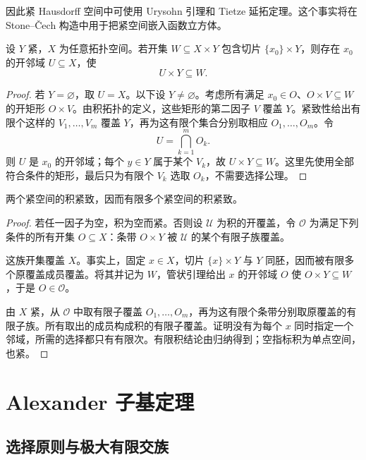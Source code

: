 因此紧 Hausdorff 空间中可使用 Urysohn 引理和 Tietze 延拓定理。这个事实将在 Stone--Čech 构造中用于把紧空间嵌入函数立方体。

\begin{lemma}[管状引理]
\label{lem:tube-lemma}
设 \(Y\) 紧，\(X\) 为任意拓扑空间。若开集
\(W\subseteq X\times Y\) 包含切片 \(\{x_0\}\times Y\)，则存在
\(x_0\) 的开邻域 \(U\subseteq X\)，使
\[
 U\times Y\subseteq W.
\]
\end{lemma}

\begin{proof}
若 \(Y=\varnothing\)，取 \(U=X\)。以下设 \(Y\ne\varnothing\)。考虑所有满足 \(x_0\in O\)、\(O\times V\subseteq W\) 的开矩形 \(O\times V\)。由积拓扑的定义，这些矩形的第二因子 \(V\) 覆盖 \(Y\)。紧致性给出有限个这样的 \(V_1,\ldots,V_m\) 覆盖 \(Y\)，再为这有限个集合分别取相应 \(O_1,\ldots,O_m\)。令
\[
 U=\bigcap_{k=1}^m O_k.
\]
则 \(U\) 是 \(x_0\) 的开邻域；每个 \(y\in Y\) 属于某个 \(V_k\)，故 \(U\times Y\subseteq W\)。这里先使用全部符合条件的矩形，最后只为有限个 \(V_k\) 选取 \(O_k\)，不需要选择公理。
\end{proof}

\begin{corollary}[有限乘积紧致性]
\label{cor:finite-product-compact}
两个紧空间的积紧致，因而有限多个紧空间的积紧致。
\end{corollary}

\begin{proof}
若任一因子为空，积为空而紧。否则设 \(\mathcal U\) 为积的开覆盖，令 \(\mathcal O\) 为满足下列条件的所有开集 \(O\subseteq X\)：条带 \(O\times Y\) 被 \(\mathcal U\) 的某个有限子族覆盖。

这族开集覆盖 \(X\)。事实上，固定 \(x\in X\)，切片 \(\{x\}\times Y\) 与 \(Y\) 同胚，因而被有限多个原覆盖成员覆盖。将其并记为 \(W\)，管状引理给出 \(x\) 的开邻域 \(O\) 使 \(O\times Y\subseteq W\)，于是 \(O\in\mathcal O\)。

由 \(X\) 紧，从 \(\mathcal O\) 中取有限子覆盖 \(O_1,\ldots,O_m\)，再为这有限个条带分别取原覆盖的有限子族。所有取出的成员构成积的有限子覆盖。证明没有为每个 \(x\) 同时指定一个邻域，所需的选择都只有有限次。有限积结论由归纳得到；空指标积为单点空间，也紧。
\end{proof}

\section{Alexander 子基定理}

\subsection{选择原则与极大有限交族}

